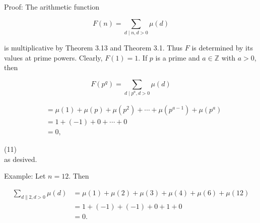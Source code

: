 \documentclass[10pt]{article}
\begin{document}
Proof: The arithmetic function

$$
F(n)=\sum_{d \mid n, d>0} \mu(d)
$$

is multiplicative by Theorem 3.13 and Theorem 3.1. Thus $F$ is determined by its values at prime powers. Clearly, $F(1)=1$. If $p$ is a prime and $a \in \mathbb{Z}$ with $a>0$, then

$$
F\left(p^{q}\right)=\sum_{d \mid p^{a}, d>0} \mu(d)
$$

$$
\begin{aligned}
& =\mu(1)+\mu(p)+\mu\left(p^{2}\right)+\cdots+\mu\left(p^{a-1}\right)+\mu\left(p^{a}\right) \\
& =1+(-1)+0+\cdots+0 \\
& =0,
\end{aligned}
$$

(11)\\
as desived.

Example: Let $n=12$. Then

$$
\begin{aligned}
\sum_{d \| 2, d>0} \mu(d) & =\mu(1)+\mu(2)+\mu(3)+\mu(4)+\mu(6)+\mu(12) \\
& =1+(-1)+(-1)+0+1+0 \\
& =0 .
\end{aligned}
$$
\end{document}
